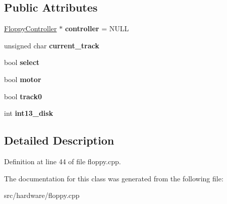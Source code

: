 \subsection*{Public Attributes}
\begin{DoxyCompactItemize}
\item 
\hypertarget{classFloppyDevice_a8ffa0135f4b836426a32b96680dc51a0}{\hyperlink{classFloppyController}{Floppy\-Controller} $\ast$ {\bfseries controller} = N\-U\-L\-L}\label{classFloppyDevice_a8ffa0135f4b836426a32b96680dc51a0}

\item 
\hypertarget{classFloppyDevice_a34366d0b663e4c660875c22b1f7efa8b}{unsigned char {\bfseries current\-\_\-track}}\label{classFloppyDevice_a34366d0b663e4c660875c22b1f7efa8b}

\item 
\hypertarget{classFloppyDevice_a7af7286e2e7558074b0853a10a37d80f}{bool {\bfseries select}}\label{classFloppyDevice_a7af7286e2e7558074b0853a10a37d80f}

\item 
\hypertarget{classFloppyDevice_a00f5510f11e8fad3b0233c9d3b293fd7}{bool {\bfseries motor}}\label{classFloppyDevice_a00f5510f11e8fad3b0233c9d3b293fd7}

\item 
\hypertarget{classFloppyDevice_a81025c10fec2b1d3f39cba566c89d796}{bool {\bfseries track0}}\label{classFloppyDevice_a81025c10fec2b1d3f39cba566c89d796}

\item 
\hypertarget{classFloppyDevice_aea6d0c8cb2f60c2cc106b0c722d2f8de}{int {\bfseries int13\-\_\-disk}}\label{classFloppyDevice_aea6d0c8cb2f60c2cc106b0c722d2f8de}

\end{DoxyCompactItemize}


\subsection{Detailed Description}


Definition at line 44 of file floppy.\-cpp.



The documentation for this class was generated from the following file\-:\begin{DoxyCompactItemize}
\item 
src/hardware/floppy.\-cpp\end{DoxyCompactItemize}
